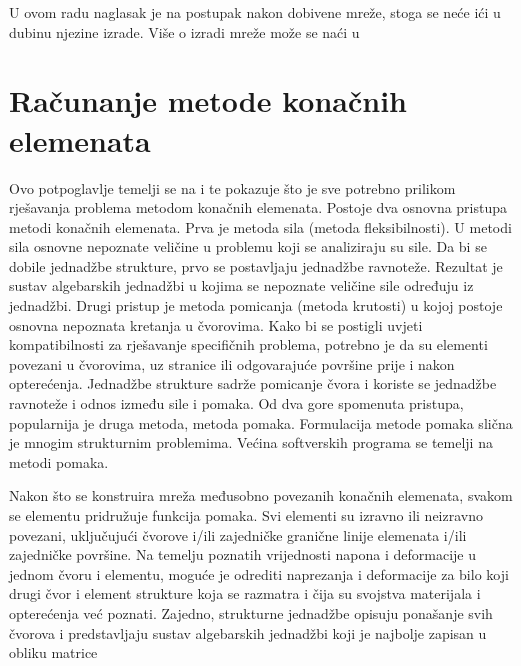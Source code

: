 \documentclass[a4paper,twoside,12pt]{memoir} %
\begin{document}
U ovom radu naglasak je na postupak nakon dobivene mreže, stoga se neće ići u dubinu njezine izrade. Više o izradi mreže može se naći u \cite{tadej}

\section{Računanje metode konačnih elemenata}
Ovo potpoglavlje temelji se na \cite{jurica_soric} i \cite{fem_predavanja_bosna} te pokazuje što je sve potrebno prilikom rješavanja problema metodom konačnih elemenata.
Postoje dva osnovna pristupa metodi konačnih elemenata. 
Prva je metoda sila (metoda fleksibilnosti). U metodi sila osnovne nepoznate veličine u problemu koji se analiziraju su sile. Da bi se dobile jednadžbe strukture, prvo se postavljaju jednadžbe ravnoteže. Rezultat je sustav algebarskih jednadžbi u kojima se nepoznate veličine sile određuju iz jednadžbi.
Drugi pristup je metoda pomicanja (metoda krutosti) u kojoj postoje osnovna nepoznata kretanja u čvorovima. Kako bi se postigli uvjeti kompatibilnosti za rješavanje specifičnih problema, potrebno je da su elementi povezani u čvorovima, uz stranice ili odgovarajuće površine prije i nakon opterećenja. Jednadžbe strukture sadrže pomicanje čvora i koriste se jednadžbe ravnoteže i odnos između sile i pomaka. 
Od dva gore spomenuta pristupa, popularnija je druga metoda, metoda pomaka. Formulacija metode pomaka slična je mnogim strukturnim problemima. Većina softverskih programa se temelji na metodi pomaka. \par

Nakon što se konstruira mreža međusobno povezanih konačnih elemenata, svakom se elementu pridružuje funkcija pomaka. Svi elementi su izravno ili neizravno povezani, uključujući čvorove i/ili zajedničke granične linije elemenata i/ili zajedničke površine.
Na temelju poznatih vrijednosti napona i deformacije u jednom čvoru i elementu, moguće je odrediti naprezanja i deformacije za bilo koji drugi čvor i element strukture koja se razmatra i čija su svojstva materijala i opterećenja već poznati. Zajedno, strukturne jednadžbe opisuju ponašanje svih čvorova i predstavljaju sustav algebarskih jednadžbi koji je najbolje zapisan u obliku matrice \par
\end{document}
